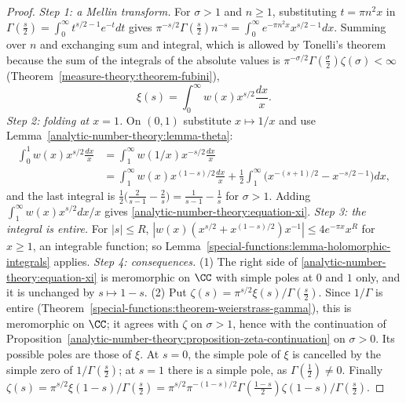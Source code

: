 \begin{proof}
\emph{Step 1: a Mellin transform.} For $\sigma > 1$ and $n \geq 1$, substituting $t = \pi n^2x$ in $\Gamma(\frac s2) = \int_0^\infty t^{s/2-1}e^{-t}dt$ gives
$\pi^{-s/2}\Gamma(\frac s2)n^{-s} = \int_0^\infty e^{-\pi n^2x}x^{s/2-1}dx$. Summing over $n$ and exchanging sum and integral, which is allowed by Tonelli's theorem because the sum of the integrals of the
absolute values is $\pi^{-\sigma/2}\Gamma(\frac\sigma2)\zeta(\sigma) < \infty$ (Theorem~\ref{measure-theory:theorem-fubini}),
\[
\xi(s) = \int_0^\infty w(x)x^{s/2}\frac{dx}{x}.
\]
\emph{Step 2: folding at $x = 1$.} On $(0, 1)$ substitute $x \mapsto 1/x$ and use Lemma~\ref{analytic-number-theory:lemma-theta}:
\[
\begin{aligned}
\int_0^1w(x)x^{s/2}\frac{dx}{x} &= \int_1^\infty w(1/x)x^{-s/2}\frac{dx}{x} \\
&= \int_1^\infty w(x)x^{(1-s)/2}\frac{dx}{x} + \frac12\int_1^\infty\bigl(x^{-(s+1)/2} - x^{-s/2-1}\bigr)dx,
\end{aligned}
\]
and the last integral is $\frac12\bigl(\frac{2}{s - 1} - \frac2s\bigr) = \frac{1}{s - 1} - \frac1s$ for $\sigma > 1$. Adding $\int_1^\infty w(x)x^{s/2}dx/x$ gives \eqref{analytic-number-theory:equation-xi}.
\emph{Step 3: the integral is entire.} For $|s| \leq R$, $|w(x)(x^{s/2} + x^{(1-s)/2})x^{-1}| \leq 4e^{-\pi x}x^{R}$ for $x \geq 1$, an integrable function; so
Lemma~\ref{special-functions:lemma-holomorphic-integrals} applies.
\emph{Step 4: consequences.} (1) The right side of \eqref{analytic-number-theory:equation-xi} is meromorphic on $\CC$ with simple poles at $0$ and $1$ only, and it is unchanged by $s \mapsto 1 - s$.
(2) Put $\zeta(s) = \pi^{s/2}\xi(s)/\Gamma(\frac s2)$. Since $1/\Gamma$ is entire (Theorem~\ref{special-functions:theorem-weierstrass-gamma}), this is meromorphic on $\CC$; it agrees with $\zeta$
on $\sigma > 1$, hence with the continuation of Proposition~\ref{analytic-number-theory:proposition-zeta-continuation} on $\sigma > 0$. Its possible poles are those of $\xi$. At $s = 0$, the simple pole
of $\xi$ is cancelled by the simple zero of $1/\Gamma(\frac s2)$; at $s = 1$ there is a simple pole, as $\Gamma(\frac12) \neq 0$. Finally
$\zeta(s) = \pi^{s/2}\xi(1 - s)/\Gamma(\frac s2) = \pi^{s/2}\pi^{-(1-s)/2}\Gamma(\frac{1 - s}2)\zeta(1 - s)/\Gamma(\frac s2)$.
\end{proof}

